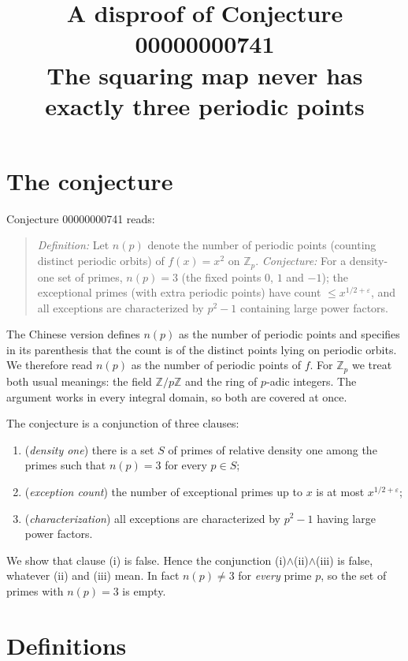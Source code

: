 \documentclass[11pt]{article}
\title{A disproof of Conjecture 00000000741\\[2pt]
\large The squaring map never has exactly three periodic points}
\date{}
\theoremstyle{definition}
\theoremstyle{remark}
\renewcommand{\_}{\oldus\allowbreak}
\begin{document}
\sloppy
\maketitle

\section{The conjecture}

Conjecture 00000000741 reads:

\begin{quote}
\emph{Definition:} Let $n(p)$ denote the number of periodic points (counting distinct periodic orbits) of
$f(x) = x^2$ on $\mathbb{Z}_p$. \emph{Conjecture:} For a density-one set of primes, $n(p) = 3$ (the fixed
points $0$, $1$ and $-1$); the exceptional primes (with extra periodic points) have count
$\le x^{1/2+\varepsilon}$, and all exceptions are characterized by $p^2 - 1$ containing large power factors.
\end{quote}

The Chinese version defines $n(p)$ as the number of periodic points and specifies in its parenthesis that
the count is of the distinct points lying on periodic orbits. We therefore read $n(p)$ as the number of
periodic points of $f$. For $\mathbb{Z}_p$ we treat both usual meanings: the field $\mathbb{Z}/p\mathbb{Z}$
and the ring of $p$-adic integers. The argument works in every integral domain, so both are covered at once.

The conjecture is a conjunction of three clauses:
\begin{enumerate}[label=(\roman*)]
  \item (\emph{density one}) there is a set $S$ of primes of relative density one among the primes such that
        $n(p) = 3$ for every $p \in S$;
  \item (\emph{exception count}) the number of exceptional primes up to $x$ is at most $x^{1/2+\varepsilon}$;
  \item (\emph{characterization}) all exceptions are characterized by $p^2-1$ having large power factors.
\end{enumerate}
We show that clause (i) is false. Hence the conjunction (i)$\wedge$(ii)$\wedge$(iii) is false, whatever
(ii) and (iii) mean. In fact $n(p) \ne 3$ for \emph{every} prime $p$, so the set of primes with $n(p)=3$ is
empty.

\section{Definitions}
\end{document}
